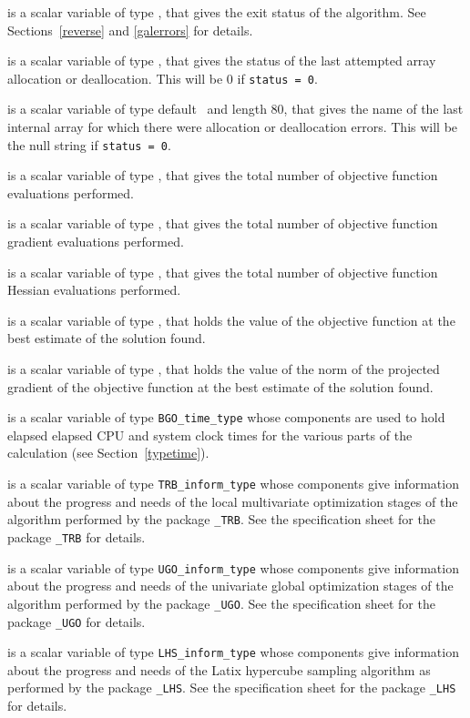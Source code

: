 \documentclass{galahad}
\newcommand{\packagename}{BGO}
\begin{document}
\begin{description}
 is a scalar variable of type \integer, that gives the
exit status of the algorithm.
See Sections~\ref{reverse} and \ref{galerrors}
for details.

 is a scalar variable of type \integer, that gives
the status of the last attempted array allocation or deallocation.
This will be 0 if {\tt status = 0}.

 is a scalar variable of type default \character\
and length 80, that  gives the name of the last internal array
for which there were allocation or deallocation errors.
This will be the null string if {\tt status = 0}.

 is a scalar variable of type \integer, that gives the
total number of objective function evaluations performed.

 is a scalar variable of type \integer, that gives the
total number of objective function gradient evaluations performed.

 is a scalar variable of type \integer, that gives the
total number of objective function Hessian evaluations performed.

 is a scalar variable of type \realdp, that holds the
value of the objective function at the best estimate of the solution found.

 is a scalar variable of type \realdp, that holds the
value of the norm of the projected gradient of the objective function 
at the best estimate of the solution found.

 is a scalar variable of type {\tt \packagename\_time\_type}
whose components are used to hold elapsed elapsed CPU and system clock
times for the various parts of the calculation (see Section~\ref{typetime}).

 is a scalar variable of type
{\tt TRB\_inform\_type}
whose components give information about the progress and needs of the local
multivariate optimization stages of the algorithm performed by the package
{\tt \libraryname\_TRB}.
See the specification sheet for the package
{\tt \libraryname\_TRB}
for details.

 is a scalar variable of type
{\tt UGO\_inform\_type}
whose components give information about the progress and needs of the 
univariate global optimization stages of the algorithm performed by the package
{\tt \libraryname\_UGO}.
See the specification sheet for the package
{\tt \libraryname\_UGO}
for details.

 is a scalar variable of type
{\tt LHS\_inform\_type}
whose components give information about the progress and needs
of the Latix hypercube sampling algorithm as performed by the package
{\tt \libraryname\_LHS}.
See the specification sheet for the package
{\tt \libraryname\_LHS}
for details.

\end{description}
\end{document}
